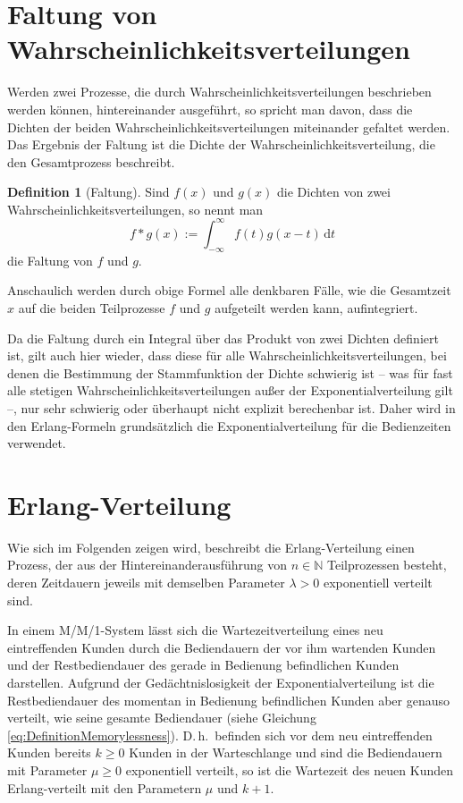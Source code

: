 \documentclass[a4paper,11pt,oneside]{article}
\theoremstyle{definition}
\newtheorem{definition}{Definition}
\begin{document}
\section{Faltung von Wahrscheinlichkeitsverteilungen}

Werden zwei Prozesse, die durch Wahrscheinlichkeitsverteilungen beschrieben werden können, hintereinander ausgeführt, so spricht man davon, dass die Dichten der beiden Wahrscheinlichkeitsverteilungen miteinander gefaltet werden. Das Ergebnis der Faltung ist die Dichte der Wahrscheinlichkeitsverteilung, die den Gesamtprozess beschreibt.

\begin{definition}[Faltung]
Sind $f(x)$ und $g(x)$ die Dichten von zwei Wahrscheinlichkeitsverteilungen, so nennt man
$$
f*g(x):=\int_{-\infty}^\infty f(t)g(x-t)\,\mbox{d}t
$$
die Faltung von $f$ und $g$.
\end{definition}

Anschaulich werden durch obige Formel alle denkbaren Fälle, wie die Gesamtzeit $x$ auf die beiden Teilprozesse $f$ und $g$ aufgeteilt werden kann, aufintegriert.

Da die Faltung durch ein Integral über das Produkt von zwei Dichten definiert ist, gilt auch hier wieder, dass diese für alle Wahrscheinlichkeitsverteilungen, bei denen die Bestimmung der Stammfunktion der Dichte schwierig ist -- was für fast alle stetigen Wahrscheinlichkeitsverteilungen außer der Exponentialverteilung gilt --, nur sehr schwierig oder überhaupt nicht explizit berechenbar ist. Daher wird in den Erlang-Formeln grundsätzlich die Exponentialverteilung für die Bedienzeiten verwendet.



\section{Erlang-Verteilung}\label{ErlangDistribution}

Wie sich im Folgenden zeigen wird, beschreibt die Erlang-Verteilung einen Prozess, der aus der Hintereinanderausführung von $n\in\mathbb{N}$ Teilprozessen besteht, deren Zeitdauern jeweils mit demselben Parameter $\lambda>0$ exponentiell verteilt sind.

In einem M/M/1-System lässt sich die Wartezeitverteilung eines neu eintreffenden Kunden durch die Bediendauern der vor ihm wartenden Kunden und der Restbediendauer des gerade in Bedienung befindlichen Kunden darstellen. Aufgrund der Gedächtnislosigkeit der Exponentialverteilung ist die Restbediendauer des momentan in Bedienung befindlichen Kunden aber genauso verteilt, wie seine gesamte Bediendauer (siehe Gleichung \eqref{eq:DefinitionMemorylessness}). D.\,h.\ befinden sich vor dem neu eintreffenden Kunden bereits $k\ge0$ Kunden in der Warteschlange und sind die Bediendauern mit Parameter $\mu\ge0$ exponentiell verteilt, so ist die Wartezeit des neuen Kunden Erlang-verteilt mit den Parametern $\mu$ und $k+1$.
\end{document}
